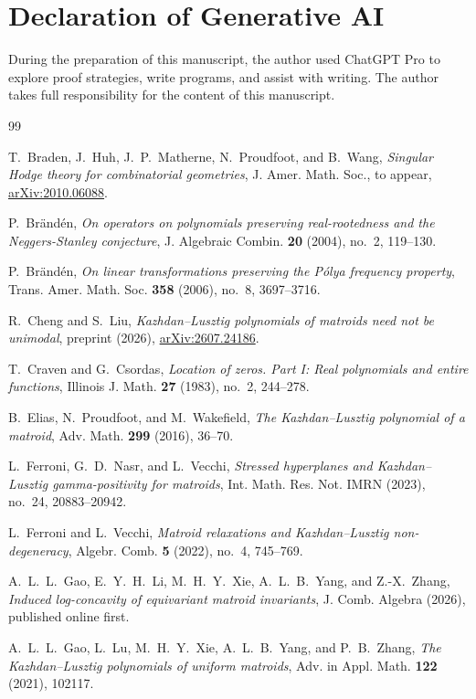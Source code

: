 \documentclass[10pt,a4paper]{article}
\numberwithin{equation}{section}
\theoremstyle{remark}\newtheorem{remark}[theorem]{Remark}
\begin{document}
\section*{Declaration of Generative AI}
During the preparation of this manuscript, the author used ChatGPT Pro
to explore proof strategies, write programs, and assist with writing.
The author takes full responsibility for the content of this manuscript.

\begin{thebibliography}{99}
\small

T.~Braden, J.~Huh, J.~P.~Matherne, N.~Proudfoot, and B.~Wang,
\emph{Singular Hodge theory for combinatorial geometries},
J. Amer. Math. Soc., to appear,
\href{https://arxiv.org/abs/2010.06088}{arXiv:2010.06088}.

P.~Br\"and\'en,
\emph{On operators on polynomials preserving real-rootedness and the
Neggers-Stanley conjecture},
J. Algebraic Combin. \textbf{20} (2004), no.~2, 119--130.

P.~Br\"and\'en,
\emph{On linear transformations preserving the P\'olya frequency property},
Trans. Amer. Math. Soc. \textbf{358} (2006), no.~8, 3697--3716.

R.~Cheng and S.~Liu,
\emph{Kazhdan--Lusztig polynomials of matroids need not be unimodal},
preprint (2026),
\href{https://arxiv.org/abs/2607.24186}{arXiv:2607.24186}.

T.~Craven and G.~Csordas,
\emph{Location of zeros. Part I: Real polynomials and entire functions},
Illinois J. Math. \textbf{27} (1983), no.~2, 244--278.

B.~Elias, N.~Proudfoot, and M.~Wakefield,
\emph{The Kazhdan--Lusztig polynomial of a matroid},
Adv. Math. \textbf{299} (2016), 36--70.

L.~Ferroni, G.~D.~Nasr, and L.~Vecchi,
\emph{Stressed hyperplanes and Kazhdan--Lusztig gamma-positivity for matroids},
Int. Math. Res. Not. IMRN (2023), no.~24, 20883--20942.

L.~Ferroni and L.~Vecchi,
\emph{Matroid relaxations and Kazhdan--Lusztig non-degeneracy},
Algebr. Comb. \textbf{5} (2022), no.~4, 745--769.

A.~L.~L.~Gao, E.~Y.~H.~Li, M.~H.~Y.~Xie, A.~L.~B.~Yang, and Z.-X.~Zhang,
\emph{Induced log-concavity of equivariant matroid invariants},
J. Comb. Algebra (2026), published online first.

A.~L.~L.~Gao, L.~Lu, M.~H.~Y.~Xie, A.~L.~B.~Yang, and P.~B.~Zhang,
\emph{The Kazhdan--Lusztig polynomials of uniform matroids},
Adv. in Appl. Math. \textbf{122} (2021), 102117.


\end{thebibliography}
\end{document}
